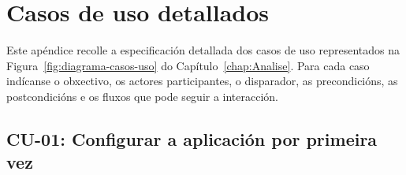 \chapter{Casos de uso detallados}
\label{app:casos-uso}

Este apéndice recolle a especificación detallada dos casos de uso
representados na Figura~\ref{fig:diagrama-casos-uso} do
Capítulo~\ref{chap:Analise}. Para cada caso indícanse o obxectivo,
os actores participantes, o disparador, as precondicións,
as postcondicións e os fluxos que pode seguir a interacción.



\section{CU-01: Configurar a aplicación por primeira vez}
\label{cu:configuracion-inicial}

